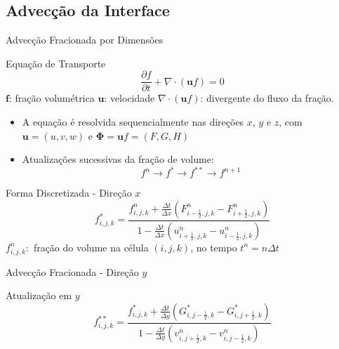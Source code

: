 \documentclass[../main/main.tex]{subfiles}
\begin{document}
\subsection{Advecção da Interface}

\begin{frame}{Advecção Fracionada por Dimensões}
  \begin{block}{Equação de Transporte}
      \[
        \frac{\partial f}{\partial t} + \nabla \cdot (\mathbf{u} f) = 0
      \]
      \scriptsize
      \(\mathbf{f}\): fração volumétrica \hfill \(\mathbf{u}\): velocidade \hfill
      \(\nabla \cdot (\mathbf{u} f)\): divergente do fluxo da fração.
  \end{block}
  
  \begin{itemize}
    \item A equação é resolvida sequencialmente nas direções $x$, $y$ e $z$, com $\mathbf{u} = (u,v,w)$ e $\mathbf{\Phi} = \mathbf{u} f = (F,G,H)$
    \item Atualizações sucessivas da fração de volume:
      \[
        f^n \rightarrow f^{*} \rightarrow f^{**} \rightarrow f^{n+1}
      \]
  \end{itemize}
\end{frame}

\begin{frame}
  \vspace{-2cm}
  \begin{block}{Forma Discretizada - Direção $x$}
  \scriptsize
  \[
  f^{*}_{i,j,k} =
  \frac{
    f^{n}_{i,j,k} + \frac{\Delta t}{\Delta x}\left(F^{n}_{i-\frac{1}{2},j,k} - F^{n}_{i+\frac{1}{2},j,k}\right)
  }{
    1 - \frac{\Delta t}{\Delta x}\left(u^{n}_{i+\frac{1}{2},j,k} - u^{n}_{i-\frac{1}{2},j,k}\right)
  }
  \]
  \(f^{n}_{i,j,k}:\) fração do volume na célula $(i,j,k)$, no tempo $t^n = n \Delta t$
  \end{block}
\end{frame}


\begin{frame}{Advecção Fracionada - Direção $y$}
  \vspace{-2cm}
  \begin{block}{Atualização em $y$}
  \scriptsize
  \[
  f^{**}_{i,j,k} =
  \frac{
    f^{*}_{i,j,k} + \frac{\Delta t}{\Delta y}\left(G^{*}_{i,j-\frac{1}{2},k} - G^{*}_{i,j+\frac{1}{2},k}\right)
  }{
    1 - \frac{\Delta t}{\Delta y}\left(v^{n}_{i,j+\frac{1}{2},k} - v^{n}_{i,j-\frac{1}{2},k}\right)
  }
  \]
  \end{block}
\end{frame}
\end{document}

